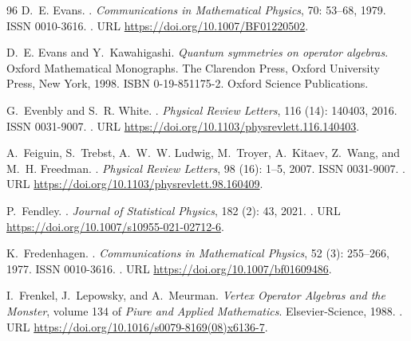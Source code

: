 \documentclass[a4paper, 11pt]{article}
\DeclareMathOperator{\1}{\mathds{1}}
\begin{document}
\begin{thebibliography}{96}
D.~E. Evans.
.
\newblock \emph{Communications in Mathematical Physics}, 70: 53--68,
  1979.
\newblock ISSN 0010-3616.
\newblock {}.
\newblock URL \url{https://doi.org/10.1007/BF01220502}.

D.~E. Evans and Y.~Kawahigashi.
\newblock \emph{Quantum symmetries on operator algebras}.
\newblock Oxford Mathematical Monographs. The Clarendon Press, Oxford
  University Press, New York, 1998.
\newblock ISBN 0-19-851175-2.
\newblock Oxford Science Publications.

G.~Evenbly and S.~R. White.
.
\newblock \emph{Physical Review Letters}, 116 (14): 140403,
  2016.
\newblock ISSN 0031-9007.
\newblock {}.
\newblock URL \url{https://doi.org/10.1103/physrevlett.116.140403}.

A.~Feiguin, S.~Trebst, A.~W.~W. Ludwig, M.~Troyer, A.~Kitaev, Z.~Wang, and
  M.~H. Freedman.
.
\newblock \emph{Physical Review Letters}, 98 (16): 1--5,
  2007.
\newblock ISSN 0031-9007.
\newblock {}.
\newblock URL \url{https://doi.org/10.1103/physrevlett.98.160409}.

P.~Fendley.
.
\newblock \emph{Journal of Statistical Physics}, 182 (2): 43,
  2021.
\newblock {}.
\newblock URL \url{https://doi.org/10.1007/s10955-021-02712-6}.

K.~Fredenhagen.
.
\newblock \emph{Communications in Mathematical Physics}, 52
  (3): 255--266, 1977.
\newblock ISSN 0010-3616.
\newblock {}.
\newblock URL \url{https://doi.org/10.1007/bf01609486}.

I.~Frenkel, J.~Lepowsky, and A.~Meurman.
\newblock \emph{{Vertex Operator Algebras and the Monster}}, volume 134 of
  \emph{Piure and Applied Mathematics}.
\newblock Elsevier-Science, 1988.
\newblock {}.
\newblock URL \url{https://doi.org/10.1016/s0079-8169(08)x6136-7}.


\end{thebibliography}
\end{document}
